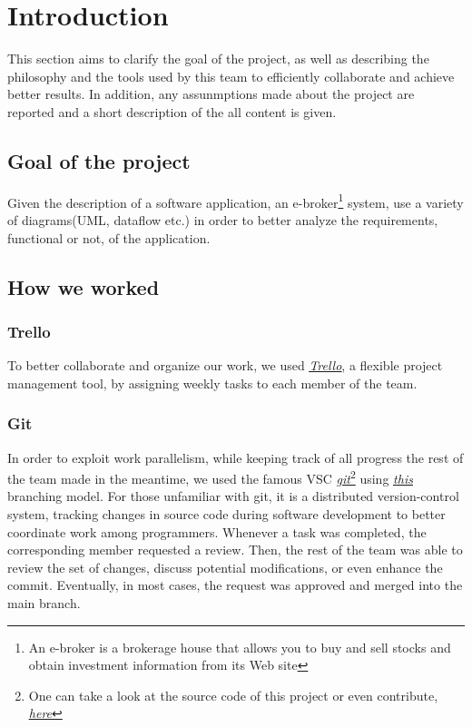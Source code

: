 \documentclass{article}
\begin{document}
\tableofcontents
\newpage
\section{Introduction}
This section aims to clarify the goal of the project, as well as describing the philosophy and the tools used by this team to efficiently collaborate and achieve better results. In addition, any assunmptions made about the project are reported and a short description of the all content is given.
\subsection{Goal of the project}
Given the description of a software application, an e-broker\footnote{An e-broker is a brokerage house that allows you to buy and sell stocks and obtain investment information from its Web site} system, use a variety of diagrams(UML, dataflow etc.) in order to better analyze the requirements, functional or not, of the application. 
\subsection{How we worked}

\subsubsection{Trello}
To better collaborate and organize our work, we used \href{https://trello.com}{\underline{\textit{Trello}}}, a flexible project management tool, by assigning weekly tasks to each member of the team.

\subsubsection{Git}
In order to exploit work parallelism, while keeping track of all progress the rest of the team made in the meantime, we used the famous VSC \href{https://github.com/}{\underline{\emph{git}}}\footnote{One can take a look at the source code of this project or even contribute, \href{https://github.com/KostasKoyias/Software_Analysis}{\underline{\textit{here}}}} using \href{https://nvie.com/files/Git-branching-model.pdf}{\underline{\emph{this}}} branching model. For those unfamiliar with git, it is a distributed version-control system, tracking changes in source code during software development to better coordinate work among programmers. Whenever a task was completed, the corresponding member requested a review. Then, the rest of the team was able to review the set of changes, discuss potential modifications, or even enhance the commit. Eventually, in most cases, the request was approved and merged into the main branch.
\end{document}
